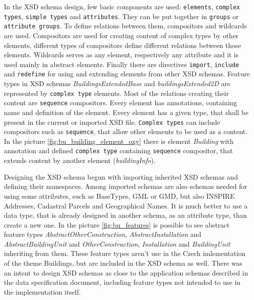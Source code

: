\documentclass[eprint]{actapoly}
\begin{document}
In the XSD schema design, few basic components are used: \texttt{elements}, \texttt{complex types}, \texttt{simple types} and \texttt{attributes}. They can be put together in \texttt{groups} or \texttt{attribute groups}. To define relations between them, compositors and wildcards are used. Compositors are used for creating content of complex types by other elements, different types of compositors define different relations between those elements. Wildcards serves as any element, respectively any attribute and it is used mainly in abstract elements. Finally there are directives \texttt{import}, \texttt{include }and \texttt{redefine} for using and extending elements from other XSD schemas. Feature types in XSD schemas \textit{BuildingsExtendedBase} and \textit{buildingsExtended2D} are represented by \texttt{complex type} elements. Most of the relations creating their content are \texttt{sequence} compositors. Every element has annotations, containing name and definition of the element. Every element has a given type, that shall be present in the current or imported XSD file. \texttt{Complex types} can include compositors such as \texttt{sequence}, that allow other elements to be used as a content.  In the picture \ref{fig:bu_building_element_oxy} there is element \textit{Building} with annotation and defined \texttt{complex type} containing \texttt{sequence} compositor, that extends content by another element (\textit{buildingInfo}).

Designing the XSD schema begun with importing inherited XSD schemas and defining their namespaces. Among imported schemas are also schemas needed for using some attributes, such as BaseTypes, GML or GMD, but also INSPIRE Addresses, Cadastral Parcels and Geographical Names. It is much better to use a data type, that is already designed in another schema, as an attribute type, than create a new one. In the picture \ref{fig:bu_features} is possible to see abstract feature types \textit{AbstractOtherConstruction}, \textit{AbstractInstallation}  and \textit{AbstractBuildingUnit} and \textit{OtherConstruction}, \textit{Installation} and \textit{BuildingUnit} inheriting from them. These feature types aren't use in the Czech imlementation of the theme Buildings, but are included in the XSD schema as well. There was an intent to design XSD schemas as close to the application schemas described in the data specification document, including feature types not intended to use in the implementation itself.
\end{document}
